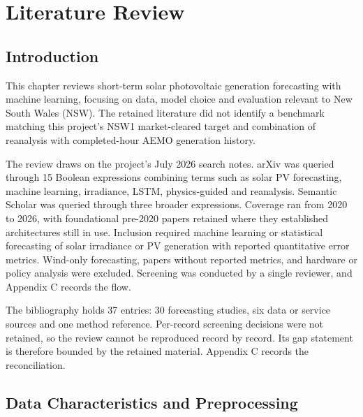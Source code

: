 \section{Literature Review}
\subsection{Introduction}

This chapter reviews short-term solar photovoltaic generation forecasting with machine learning, focusing on data, model choice and evaluation relevant to New South Wales (NSW). The retained literature did not identify a benchmark matching this project’s NSW1 market-cleared target and combination of reanalysis with completed-hour AEMO generation history.

The review draws on the project's July 2026 search notes. arXiv was queried through 15 Boolean expressions combining terms such as solar PV forecasting, machine learning, irradiance, LSTM, physics-guided and reanalysis. Semantic Scholar was queried through three broader expressions. Coverage ran from 2020 to 2026, with foundational pre-2020 papers retained where they established architectures still in use. Inclusion required machine learning or statistical forecasting of solar irradiance or PV generation with reported quantitative error metrics. Wind-only forecasting, papers without reported metrics, and hardware or policy analysis were excluded. Screening was conducted by a single reviewer, and Appendix C records the flow.

The bibliography holds 37 entries: 30 forecasting studies, six data or service sources and one method reference. Per-record screening decisions were not retained, so the review cannot be reproduced record by record. Its gap statement is therefore bounded by the retained material. Appendix C records the reconciliation.

\subsection{Data Characteristics and Preprocessing}

